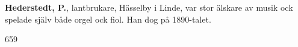 \textbf{Hederstedt, P.}, lantbrukare, Hässelby i Linde, var stor älskare av musik ock spelade själv både orgel ock fiol. Han dog på 1890-talet.

659
